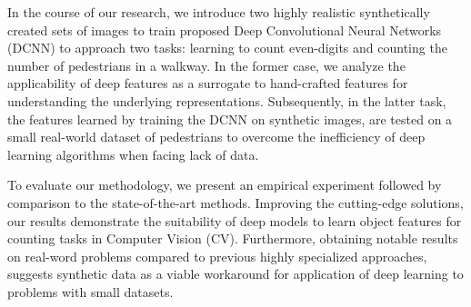 \documentclass[11pt, oneside]{book}
\begin{document}

In the course of our research, we introduce two highly realistic synthetically created sets of images to train proposed Deep Convolutional Neural Networks (DCNN) to approach two tasks: learning to count even-digits and counting the number of pedestrians in a walkway. In the former case, we analyze the applicability of deep features as a surrogate to hand-crafted features for understanding the underlying representations. Subsequently, in the latter task, the features learned by training the DCNN on synthetic images, are tested on a small real-world dataset of pedestrians to overcome the inefficiency of deep learning algorithms when facing lack of data.


To evaluate our methodology, we present an empirical experiment followed by comparison to the state-of-the-art methods. Improving the cutting-edge solutions, our results demonstrate the suitability of deep models to learn object features for counting tasks in Computer Vision (CV). Furthermore, obtaining notable results on real-word problems compared to previous highly specialized approaches, suggests synthetic data as a viable workaround for application of deep learning to problems with small datasets. 

 



     



 


\tableofcontents

\listoffigures

\listoftables
\end{document}
